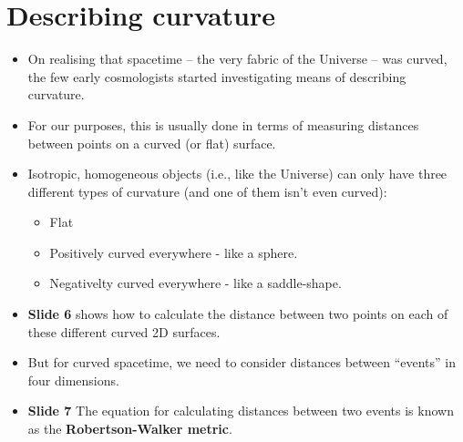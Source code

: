 \documentclass[11pt]{article}
\begin{document}
\section{Describing curvature}
\begin{itemize}
\item On realising that spacetime -- the very fabric of the Universe -- was curved, the few early cosmologists started investigating means of describing curvature.
\item For our purposes, this is usually done in terms of measuring distances between points on a curved (or flat) surface.
\item Isotropic, homogeneous objects (i.e., like the Universe) can only have three different types of curvature (and one of them isn't even curved):
\begin{itemize}
\item Flat
\item Positively curved everywhere - like a sphere.
\item Negativelty curved everywhere - like a saddle-shape.
\end{itemize}
\item {\bf Slide 6} shows how to calculate the distance between two points on each of these different curved 2D surfaces.
\item But for curved spacetime, we need to consider distances between ``events'' in four dimensions.
\item {\bf Slide 7} The equation for calculating distances between two events is known as the {\bf Robertson-Walker metric}.
\end{itemize}
\end{document}
